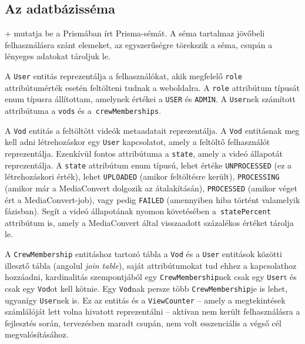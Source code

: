 \subsection{Az adatbázisséma}

\Az+ mutatja be a Prismában írt Prisma-sémát. A séma tartalmaz jövőbeli felhasználásra szánt elemeket, az egyszerűségre törekszik a séma, csupán a lényeges adatokat tároljuk le.

A \verb|User| entitás reprezentálja a felhasználókat, akik megfelelő \verb|role| attribútumérték esetén feltölteni tudnak a weboldalra. A \verb|role| attribútum típusát enum típusra állítottam, amelynek értékei a \verb|USER| és \verb|ADMIN|. A \verb|User|nek számított attribútuma a \verb|vods| és a~\verb|crewMemberships|.

A \verb|Vod| entitás a feltöltött videók metaadatait reprezentálja. A \verb|Vod| entitásnak meg kell adni létrehozáskor egy \verb|User| kapcsolatot, amely a feltöltő felhasználót reprezentálja. Ezenkívül fontos attribútuma a \verb|state|, amely a videó állapotát reprezentálja. A \verb|state| attribútum enum típusú, lehet értéke \verb|UNPROCESSED| (ez a létrehozáskori érték), lehet \verb|UPLOADED| (amikor feltöltésre került), \verb|PROCESSING| (amikor már a MediaConvert dolgozik az átalakításán), \verb|PROCESSED| (amikor véget ért a MediaConvert-job), vagy pedig \verb|FAILED| (amennyiben hiba történt valamelyik fázisban). Segít a videó állapotának nyomon követésében a~\verb|statePercent| attribútum is, amely a MediaConvert által visszaadott százalékos értéket tárolja le.

A \verb|CrewMembership| entitáshoz tartozó tábla a \verb|Vod| és a \verb|User| entitások közötti illesztő tábla (angolul \emph{join table}), saját attribútumokat tud ehhez a kapcsolathoz hozzáadni, kardinalitás szempontjából egy \verb|CrewMembership|nek csak egy \verb|User|t és csak egy \verb|Vod|ot kell kötnie. Egy \verb|Vod|nak persze több \verb|CrewMembership|je is lehet, ugyanígy \verb|User|nek is. Ez az entitás és a \verb|ViewCounter| -- amely a megtekintések számlálóját lett volna hivatott reprezentálni -- aktívan nem került felhasználásra a fejlesztés során, tervezésben maradt csupán, nem volt esszenciális a végső cél megvalósításához.

